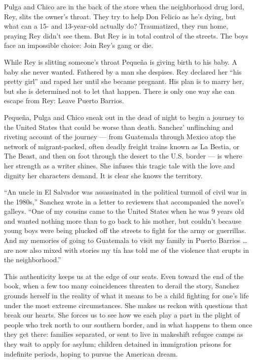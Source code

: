 Pulga and Chico are in the back of the store when the neighborhood drug
lord, Rey, slits the owner's throat. They try to help Don Felicio as
he's dying, but what can a 15- and 13-year-old actually do? Traumatized,
they run home, praying Rey didn't see them. But Rey is in total control
of the streets. The boys face an impossible choice: Join Rey's gang or
die.

While Rey is slitting someone's throat Pequeña is giving birth to his
baby. A baby she never wanted. Fathered by a man she despises. Rey
declared her ``his pretty girl'' and raped her until she became
pregnant. His plan is to marry her, but she is determined not to let
that happen. There is only one way she can escape from Rey: Leave Puerto
Barrios.

Pequeña, Pulga and Chico sneak out in the dead of night to begin a
journey to the United States that could be worse than death. Sanchez'
unflinching and riveting account of the journey --- from Guatemala
through Mexico atop the network of migrant-packed, often deadly freight
trains known as La Bestia, or The Beast, and then on foot through the
desert to the U.S. border --- is where her strength as a writer shines.
She infuses this tragic tale with the love and dignity her characters
demand. It is clear she knows the territory.

``An uncle in El Salvador was assassinated in the political turmoil of
civil war in the 1980s,'' Sanchez wrote in a letter to reviewers that
accompanied the novel's galleys. ``One of my cousins came to the United
States when he was 9 years old and wanted nothing more than to go back
to his mother, but couldn't because young boys were being plucked off
the streets to fight for the army or guerrillas. And my memories of
going to Guatemala to visit my family in Puerto Barrios \ldots{} are now
also mixed with stories my tía has told me of the violence that erupts
in the neighborhood.''

This authenticity keeps us at the edge of our seats. Even toward the end
of the book, when a few too many coincidences threaten to derail the
story, Sanchez grounds herself in the reality of what it means to be a
child fighting for one's life under the most extreme circumstances. She
makes us reckon with questions that break our hearts. She forces us to
see how we each play a part in the plight of people who trek north to
our southern border, and in what happens to them once they get there:
families separated, or sent to live in makeshift refugee camps as they
wait to apply for asylum; children detained in immigration prisons for
indefinite periods, hoping to pursue the American dream.

